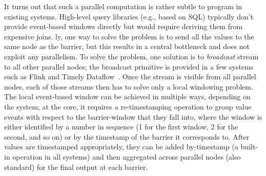It turns out that such a parallel computation is rather subtle to program in existing systems. High-level query libraries (e.g., based on SQL) typically don't provide event-based windows directly but would require deriving them from expensive joins.
\Naive{}ly, one way to solve the problem is to send all the values to the same node as the barrier, but this results in a central bottleneck and does not exploit any parallelism.
To solve the problem, one solution is to \emph{broadcast} stream to all other parallel nodes; the broadcast primitive is provided in a few systems such as Flink and Timely Dataflow~\cite{BroadcastStateFlink,BroadcastStateTimely}.
Once the stream is visible from all parallel nodes, each of those streams then has to solve only a local windowing problem.
The local event-based window can be achieved in multiple ways, depending on the system; at the core, it requires a re-timestamping operation to
group value events with respect to the barrier-window that they fall into,
where the window is either identified by a number in sequence (1 for the first window, 2 for the second, and so on) or by the timestamp of the barrier it corresponds to.
After values are timestamped appropriately, they can be added by-timestamp (a built-in operation in all systems) and then aggregated across parallel nodes (also standard) for the final output at each barrier.


